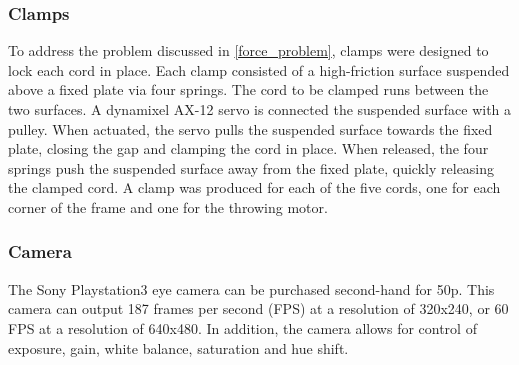 \documentclass[conference]{IEEEtran}
\begin{document}
\subsubsection{Clamps}
To address the problem discussed in \ref{force_problem}, clamps were designed to lock each cord in place. Each clamp consisted of a high-friction surface suspended above a fixed plate via four springs. The cord to be clamped runs between the two surfaces. A dynamixel AX-12 servo is connected the suspended surface with a pulley. When actuated, the servo pulls the suspended surface towards the fixed plate, closing the gap and clamping the cord in place. When released, the four springs push the suspended surface away from the fixed plate, quickly releasing the clamped cord. A clamp was produced for each of the five cords, one for each corner of the frame and one for the throwing motor.

\subsubsection{Camera}
The Sony Playstation3 eye camera can be purchased second-hand for 50p. This camera can output 187 frames per second (FPS) at a resolution of 320x240, or 60 FPS at a resolution of 640x480. In addition, the camera allows for control of exposure, gain, white balance, saturation and hue shift.
\end{document}
